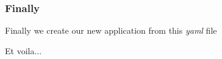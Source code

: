 \documentclass{beamer}
\begin{document}
\begin{frame}[fragile]
  \frametitle{Finally}
  Finally we create our new application from this \emph{yaml} file
  Et voila...
\end{frame}
\end{document}
